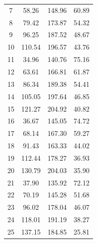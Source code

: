 \begin{longtable}{|c|c|c|c|}
    7            & 58.26                      & 148.96 & 60.89                             \\
    8            & 79.42                      & 173.87 & 54.32                             \\
    9            & 96.25                      & 187.52 & 48.67                             \\
    10           & 110.54                     & 196.57 & 43.76                             \\ \hline
    11           & 34.96                      & 140.76 & 75.16                             \\
    12           & 63.61                      & 166.81 & 61.87                             \\
    13           & 86.34                      & 189.38 & 54.41                             \\
    14           & 105.05                     & 197.64 & 46.85                             \\
    15           & 121.27                     & 204.92 & 40.82                             \\ \hline
    16           & 36.67                      & 145.05 & 74.72                             \\
    17           & 68.14                      & 167.30 & 59.27                             \\
    18           & 91.43                      & 163.33 & 44.02                             \\
    19           & 112.44                     & 178.27 & 36.93                             \\
    20           & 130.79                     & 204.03 & 35.90                             \\ \hline
    21           & 37.90                      & 135.92 & 72.12                             \\
    22           & 70.19                      & 145.28 & 51.68                             \\
    23           & 96.02                      & 178.04 & 46.07                             \\
    24           & 118.01                     & 191.19 & 38.27                             \\
    25           & 137.15                     & 184.85 & 25.81                             \\ \hline
\end{longtable}

